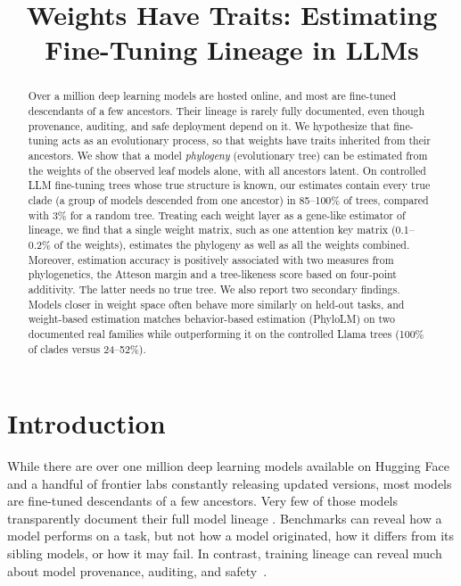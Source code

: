 \documentclass{article}
\title{Weights Have Traits: Estimating Fine-Tuning Lineage in LLMs}
\theoremstyle{definition}
\theoremstyle{plain}
\begin{document}
\maketitle

\begin{abstract}
Over a million deep learning models are hosted online, and most are fine-tuned descendants of a few ancestors. Their lineage is rarely fully documented, even though provenance, auditing, and safe deployment depend on it. We hypothesize that fine-tuning acts as an evolutionary process, so that weights have traits inherited from their ancestors. We show that a model \textit{phylogeny} (evolutionary tree) can be estimated from the weights of the observed leaf models alone, with all ancestors latent. On controlled LLM fine-tuning trees whose true structure is known, our estimates contain every true clade (a group of models descended from one ancestor) in 85--100\% of trees, compared with 3\% for a random tree. Treating each weight layer as a gene-like estimator of lineage, we find that a single weight matrix, such as one attention key matrix (0.1--0.2\% of the weights), estimates the phylogeny as well as all the weights combined. Moreover, estimation accuracy is positively associated with two measures from phylogenetics, the Atteson margin and a tree-likeness score based on four-point additivity. The latter needs no true tree. We also report two secondary findings. Models closer in weight space often behave more similarly on held-out tasks, and weight-based estimation matches behavior-based estimation (PhyloLM) on two documented real families while outperforming it on the controlled Llama trees (100\% of clades versus 24--52\%).

\end{abstract}

\section{Introduction}
\label{sec:intro}




While there are over one million deep learning models available on Hugging Face and a handful of frontier
labs constantly releasing updated versions, most models are
fine-tuned descendants of a few ancestors.  Very few of those models transparently document their full model lineage \citep{horwitz2025chartatlasworldsmodels}. Benchmarks can reveal how a model performs on a task, but not how a model originated, how it differs from its sibling models, or how it may
fail. In contrast, training lineage can reveal much about model provenance, auditing, and safety~\citep{behavioral2026provenance, nikolic2026model, tensorguard2025}.
\end{document}
